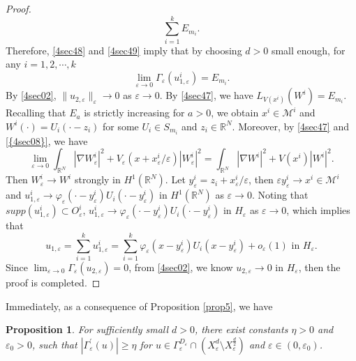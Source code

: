 \documentclass[12pt,reqno]{amsart}
\numberwithin{equation}{section}
\newtheorem{proposition}{Proposition}[section]
\begin{document}
\begin{proof}
\begin{equation}
\sum\limits_{i=1}^kE_{m_i}.
\end{equation}
Therefore, \eqref{4sec48} and \eqref{4sec49} imply that by choosing $d>0$ small enough, for any
$i=1,2,\cdots,k$
\begin{equation}\label{4sec08}
\lim\limits_{{\varepsilon}\rightarrow
0}\Gamma_{\varepsilon}(u_{1,{\varepsilon}}^i)=E_{m_i}.
\end{equation}
By \eqref{4sec02}, $\|u_{2,{\varepsilon}}\|_{\varepsilon}{\rightarrow}0$ as ${\varepsilon}{\rightarrow}0$. By \eqref{4sec47}, we have
$L_{V(x^i)}(W^i)=E_{m_i}$. Recalling that $E_a$ is strictly increasing for $a>0$, we
obtain $x^i\in \mathcal {M}^i$ and $W^i(\cdot)=U_i(\cdot-z_i)$ for some $U_i\in S_{m_i}$ and $z_i\in {\mathbb R}^N$. Moreover, by \eqref{4sec47} and {\eqref{{4sec08}}}, we have
$$
\lim_{{\varepsilon}{\rightarrow}0}\int_{{\mathbb R}^N}|{\nabla} W_{\varepsilon}^i|^2+V_{\varepsilon}(x+x_{\varepsilon}^i/{\varepsilon})|W_{\varepsilon}^i|^2=\int_{{\mathbb R}^N}|{\nabla} W^i|^2+V(x^i)|W^i|^2.
$$
Then $W_{\varepsilon}^i{\rightarrow} W^i$ strongly in $H^1({\mathbb R^N})$. Let $y_{\varepsilon}^i=z_i+x_{\varepsilon}^i/{\varepsilon}$, then ${\varepsilon} y_{\varepsilon}^i{\rightarrow} x^i\in \mathcal {M}^i$ and $u_{1,{\varepsilon}}^i{\rightarrow}{\varphi}_{\varepsilon}(\cdot-y_{\varepsilon}^i)U_i(\cdot-y_{\varepsilon}^i)$ in $H^1({\mathbb R^N})$ as ${\varepsilon}{\rightarrow}0$. Noting that $supp(u_{1,{\varepsilon}}^i)\subset O_{\varepsilon}^i$, $u_{1,{\varepsilon}}^i{\rightarrow}{\varphi}_{\varepsilon}(\cdot-y_{\varepsilon}^i)U_i(\cdot-y_{\varepsilon}^i)$ in $H_{\varepsilon}$ as ${\varepsilon}{\rightarrow}0$, which implies that
$$u_{1,{\varepsilon}}=\sum\limits_{i=1}^ku_{1,{\varepsilon}}^i=\sum\limits_{i=1}^k\varphi_{\varepsilon}(x-y_{\varepsilon}^i)U_i(x-y_{\varepsilon}^i)+o_{\varepsilon}(1)\,\,\mbox{in}\,\, H_{\varepsilon}.$$
Since $\lim_{{\varepsilon}\rightarrow
0}\Gamma_{\varepsilon}(u_{2,{\varepsilon}})=0 $, from \eqref{4sec02}, we know $u_{2,{\varepsilon}}\rightarrow 0$ in $H_{\varepsilon}$, then the proof is completed.
\end{proof}
\noindent Immediately, as a consequence of Proposition \ref{prop5}, we have
\begin{proposition}\label{prop6}
For sufficiently small $d>0$, there exist constants $\eta>0$ and
${\varepsilon}_0>0$, such that $|\Gamma_{\varepsilon}^{'}(u)|\geq \eta$ for
$u\in \Gamma_{\varepsilon}^{D_{\varepsilon}}\cap(X_{\varepsilon}^d\setminus
X_{\varepsilon}^{\frac{d}{2}})$ and ${\varepsilon}\in (0, {\varepsilon}_0)$.
\end{proposition}
\end{document}
